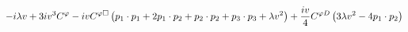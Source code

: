 %
\begin{dmath*}
%
  -  i \lambda v   +  3 i v^3C^{\varphi }  -  i vC^{ \varphi  \Box} \left(p_{1}\nobreak\cdot\nobreak{}p_{1} + 2 p_{1}\nobreak\cdot\nobreak{}p_{2} + p_{2}\nobreak\cdot\nobreak{}p_{2} + p_{3}\nobreak\cdot\nobreak{}p_{3} + \lambda v^2\right)  +  \frac{i v}{4}C^{ \varphi  D} \left(3 \lambda v^2 - 4 p_{1}\nobreak\cdot\nobreak{}p_{2}\right)
%
\end{dmath*}
%
